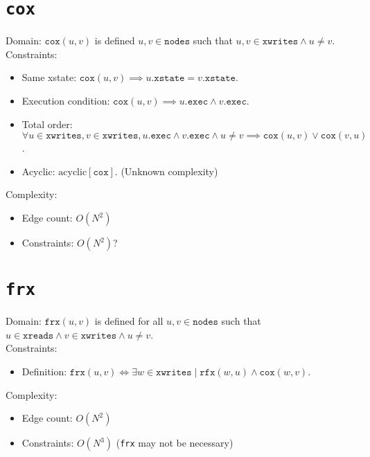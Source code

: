 \documentclass{article}
\newcommand{\nodes}{\texttt{nodes}}
\newcommand{\exec}{\texttt{exec}}
\newcommand{\rfx}{\texttt{rfx}}
\newcommand{\cox}{\texttt{cox}}
\newcommand{\frx}{\texttt{frx}}
\newcommand{\xwrites}{\texttt{xwrites}}
\newcommand{\xreads}{\texttt{xreads}}
\newcommand{\xstate}{\texttt{xstate}}
\begin{document}
\section{\cox}
Domain: $\cox(u,v)$ is defined $u,v \in \nodes$ such that
$u,v \in \xwrites \wedge u \neq v$.
\\
Constraints:
\begin{itemize}
\item Same xstate: $\cox(u,v) \implies u.\xstate = v.\xstate$.
\item Execution condition: $\cox(u,v) \implies u.\exec \wedge v.\exec$.
\item Total order: $\forall u \in \xwrites, v \in \xwrites, u.\exec \wedge v.\exec \wedge u \neq v \implies \cox(u,v) \vee \cox(v,u)$.
\item Acyclic: $\text{acyclic}[\cox]$. (Unknown complexity)
\end{itemize}
Complexity:
\begin{itemize}
\item Edge count: $O(N^2)$
\item Constraints: $O(N^2)$?
\end{itemize}

\section{\frx}
Domain: $\frx(u,v)$ is defined for all $u,v \in \nodes$ such that $u \in \xreads \wedge v \in \xwrites \wedge u \neq v$.
\\
Constraints:
\begin{itemize}
\item Definition: $\frx(u,v) \iff \exists w \in \xwrites \mid
  \rfx(w,u) \wedge \cox(w,v)$.
\end{itemize}
Complexity:
\begin{itemize}
\item Edge count: $O(N^2)$
\item Constraints: $O(N^3)$ (\frx{} may not be necessary) 
\end{itemize}
\end{document}
